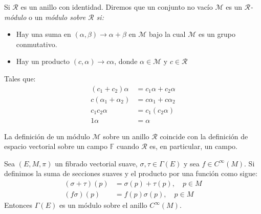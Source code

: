 \begin{definition}[Módulo]
	Si $\mathcal{R}$ es un anillo con identidad. Diremos que un conjunto no vacío $\mathcal{M}$ es un \textit{$\mathcal{R}$-módulo} o un \it{módulo sobre $\mathcal{R}$} si:
	\begin{itemize}
		\item Hay una suma en $(\alpha,\beta) \to \alpha + \beta$ en $\mathcal{M}$ bajo la cual $\mathcal{M}$ es un grupo conmutativo.
		\item Hay un producto $(c,\alpha) \to c \alpha$, donde $\alpha \in \mathcal{M}$ y $c \in \mathcal{R}$
	\end{itemize}
	Tales que:
	\begin{align*}
		(c_1 + c_2) \alpha     & = c_1 \alpha + c_2 \alpha \\
		c(\alpha_1 + \alpha_2) & = c\alpha_1 + c\alpha_2   \\
		c_1 c_2 \alpha         & = c_1(c_2 \alpha)         \\
		1 \alpha               & = \alpha
	\end{align*}
\end{definition}

La definición de un módulo $\mathcal{M}$ sobre un anillo $\mathcal{R}$ coincide con la definición de espacio vectorial sobre un campo $\mathbb{F}$ cuando $\mathcal{R}$ es, en particular, un campo.

\begin{theorem}
	Sea $(E,M, \pi)$ un fibrado vectorial suave, $\sigma, \tau \in \Gamma(E)$ y sea $f \in C^{\infty}(M)$. Si definimos la suma de secciones suaves y el producto por una función como sigue:
	\begin{align*}
		(\sigma + \tau)(p) & = \sigma(p) + \tau(p), \quad p \in M \\
		(f\sigma)(p)       & = f(p)\sigma(p), \quad p \in M
	\end{align*}
	Entonces $\Gamma(E)$ es un módulo sobre el anillo $C^{\infty}(M)$.
\end{theorem}

